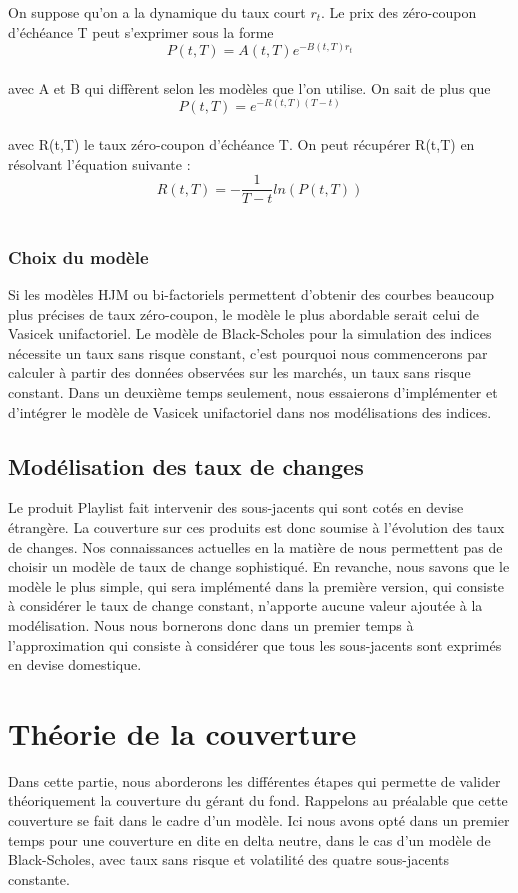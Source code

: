 \documentclass[french,12pt,a4paper]{article}
\begin{document}
On suppose qu'on a la dynamique du taux court $r_{t}$. Le prix des zéro-coupon d'échéance T peut s'exprimer sous la forme \\
$$ P(t,T)=A(t,T)e^{-B(t,T)r_{t}} $$ \\
avec A et B qui diffèrent selon les modèles que l'on utilise. On sait de plus que \\
$$ P(t,T)= e^{-R(t,T)(T-t)}  $$ \\
avec R(t,T) le taux zéro-coupon d'échéance T. On peut récupérer R(t,T) en résolvant l'équation suivante : \\
$$ R(t,T)=-\frac{1}{T-t}ln(P(t,T)) $$ \\

\subsubsection{Choix du modèle}
Si les modèles HJM ou bi-factoriels permettent d'obtenir des courbes beaucoup plus précises de taux zéro-coupon, le modèle le plus abordable serait celui de Vasicek unifactoriel. Le modèle de Black-Scholes pour la simulation des indices nécessite un taux sans risque constant, c'est pourquoi nous commencerons par calculer à partir des données observées sur les marchés, un taux sans risque constant. Dans un deuxième temps seulement, nous essaierons d'implémenter et d'intégrer le modèle de Vasicek unifactoriel dans nos modélisations des indices.

\subsection{Modélisation des taux de changes}
Le produit Playlist fait intervenir des sous-jacents qui sont cotés en devise étrangère. La couverture sur ces produits est donc soumise à l'évolution des taux de changes.
Nos connaissances actuelles en la matière de nous permettent pas de choisir un modèle de taux de change sophistiqué. En revanche, nous savons que le modèle le plus simple, qui sera implémenté dans la première version, qui consiste à considérer le taux de change constant, n'apporte aucune valeur ajoutée à la modélisation. Nous nous bornerons donc dans un premier temps à l'approximation qui consiste à considérer que tous les sous-jacents sont exprimés en devise domestique.

\newpage
\section{Théorie de la couverture}
Dans cette partie, nous aborderons les différentes étapes qui permette de valider théoriquement la couverture du gérant du fond. Rappelons au préalable que cette couverture se fait dans le cadre d'un modèle. Ici nous avons opté dans un premier temps pour une couverture en dite en delta neutre, dans le cas d'un modèle de Black-Scholes, avec taux sans risque et volatilité des quatre sous-jacents constante.
\end{document}
